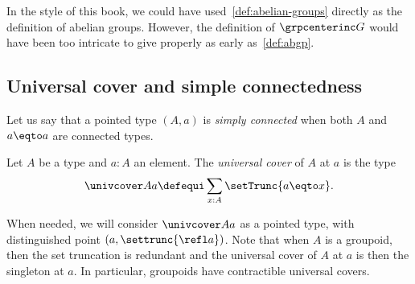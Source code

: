 \begin{remark}
  In the style of this book, we could have
  used~\cref{def:abelian-groups} directly as the definition of abelian
  groups. However, the definition of $\grpcenterinc G$ would have been
  too intricate to give properly as early as~\cref{def:abgp}.
\end{remark}

\subsection{Universal cover and simple connectedness}
\label{sec:univ-cover-simple}

Let us say that a pointed type $(A,a)$ is {\em simply connected} when
both $A$ and $a\eqto a$ are connected types.

\begin{definition}
  Let $A$ be a type and $a:A$ an element. The {\em universal cover} of $A$ at
  $a$ is the type
  \begin{displaymath}
    \univcover A a \defequi \sum_{x:A}\setTrunc{a\eqto x}.
  \end{displaymath}
\end{definition}
When needed, we will consider $\univcover A a$ as a pointed type, with
distinguished point $(a,\settrunc{\refl a})$. Note that when $A$ is a
groupoid, then the set truncation is redundant and the universal cover
of $A$ at $a$ is then the singleton at $a$. In particular, groupoids
have contractible universal covers.

